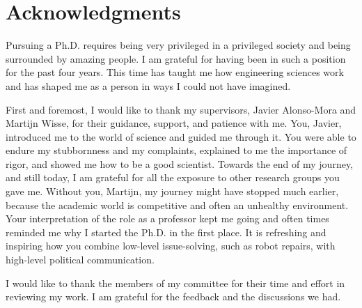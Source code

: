 \chapter*{Acknowledgments}
\label{acknowledgements}

Pursuing a Ph.D. requires being very privileged in a privileged society and
being surrounded by amazing people. I am grateful for having been in such a
position for the past four years. This time has taught me how engineering
sciences work and has shaped me as a person in ways I could not have imagined.

First and foremost, I would like to thank my supervisors, Javier Alonso-Mora and
Martijn Wisse, for their guidance, support, and patience with me. You, Javier,
introduced me to the world of science and guided me through it. You were able to
endure my stubbornness and my complaints, explained to me the importance of
rigor, and showed me how to be a good scientist.
Towards the end of my
journey, and still today, I am grateful for all the exposure to other research
groups you gave me. Without you, Martijn, my journey might have stopped
much earlier, because the academic world is competitive and often an unhealthy
environment. Your interpretation of the role as a professor kept me going and
often times reminded me why I started the Ph.D. in the first place. It is
refreshing and inspiring how you combine low-level issue-solving, such as robot
repairs, with high-level political communication.

I would like to thank the members of my committee for their time and effort in
reviewing my work. I am grateful for the feedback and the discussions we had.


